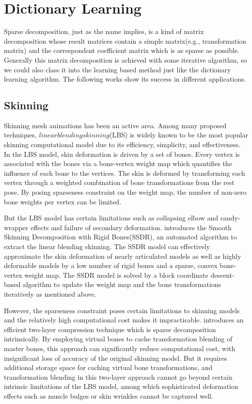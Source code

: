 \section{Dictionary Learning}
\label{sec:DictionaryLearning}

Sparse decomposition, just as the name implies, is a kind of matrix decomposition whose result matrices contain a simple matrix(e.g., transformation matrix\cite{le2012smooth}) and the correspondent coefficient matrix which is as sparse as possible. Generally this matrix decomposition is achieved with some iterative algorithm, so we could also class it into the learning based method just like the dictionary learning algorithm. The following works show its success in different applications.

\subsection{Skinning}

Skinning mesh animations has been an active area. Among many proposed techniques, $linear blending skinning$(LBS) is widely known to be the most popular skinning computational model due to its efficiency, simplicity, and effectiveness. In the LBS model, skin deformation is driven by a set of bones. Every vertex is associated with the bones via a bone-vertex weight map which quantifies the influence of each bone to the vertices. The skin is deformed by transforming each vertex through a weighted combination of bone transformations from the rest pose. By posing sparseness constraint on the weight map, the number of non-zero bone weights per vertex can be limited.

But the LBS model has certain limitations such as collapsing elbow and candy-wrapper effects and failure of secondary deformation. \cite{le2012smooth} introduces the Smooth Skinning Decomposition with Rigid Bones(SSDR), an automated algorithm to extract the linear blending skinning. The SSDR model can effectively approximate the skin deformation of nearly articulated models as well as highly deformable models by a low number of rigid bones and a sparse, convex bone-vertex weight map. The SSDR model is solved by a block coordinate descent-based algorithm to update the weight map and the bone transformations iteratively as mentioned above.

However, the sparseness constraint poses certain limitations to skinning models and the relatively high computational cost makes it impracticable. \cite{le2013two} introduces an efficient two-layer compression technique which is sparse decomposition intrinsically. By employing virtual bones to cache transformation blending of master bones, this approach can significantly reduce computational cost, with insignificant loss of accuracy of the original skinning model. But it requires additional storage space for caching virtual bone transformations, and transformation blending in this two-layer approach cannot go beyond certain intrinsic limitations of the LBS model, among which sophisticated deformation effects such as muscle bulges or skin wrinkles cannot be captured well.

